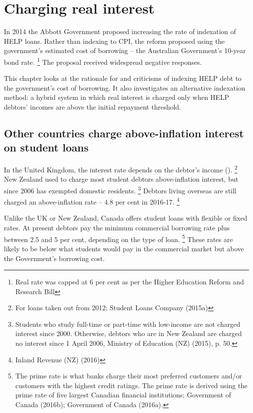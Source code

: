 \documentclass[embargoed]{grattan}
\begin{document}
\chapter{Charging real interest}\label{chap:5-charging-real-interest}

In 2014 the Abbott Government proposed increasing the rate of indexation of \gls{HELP} loans.
Rather than indexing to \gls{CPI}, the reform proposed using the government's estimated cost of borrowing -- the Australian Government's 10-year bond rate.%
\footnote{Real rate was capped at 6 per cent as per the Higher Education Reform and Research Bill} The proposal received widespread negative responses.

This chapter looks at the rationale for and criticisms of indexing \gls{HELP} debt to the government's cost of borrowing.
It also investigates an alternative indexation method: a hybrid system in which real interest is charged only when \gls{HELP} debtors' incomes are above the initial repayment threshold.

\section{Other countries charge above-inflation interest on student loans}\label{other-countries-charge-above-inflation-interest-on-student-loans}

In the United Kingdom, the interest rate depends on the debtor's income ().%
\footnote{For loans taken out from 2012; Student Loans Company (2015a)} New Zealand used to charge most student debtors above-inflation interest, but since 2006 has exempted domestic residents.%
\footnote{Students who study full-time or part-time with low-income are not charged interest since 2000.
Otherwise, debtors who are in New Zealand are charged no interest since 1 April 2006, Ministry of Education (NZ) (2015), p. 50.} Debtors living overseas are still charged an above-inflation rate -- 4.8 per cent in 2016-17.%
\footnote{Inland Revenue (NZ) (2016)}

Unlike the UK or New Zealand, Canada offers student loans with flexible or fixed rates.
At present debtors pay the minimum commercial borrowing rate plus between 2.5 and 5 per cent, depending on the type of loan.%
\footnote{The prime rate is what banks charge their most preferred customers and/or customers with the highest credit ratings.
The prime rate is derived using the prime rate of five largest Canadian financial institutions; Government of Canada (2016b); Government of Canada (2016a).} These rates are likely to be below what students would pay in the commercial market but above the Government's borrowing cost.
\end{document}
